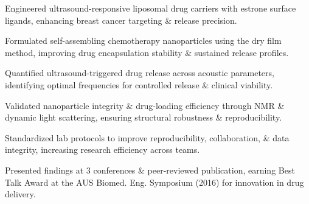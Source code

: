 \begin{tabitemize}
  \item Engineered ultrasound-responsive liposomal drug carriers with estrone surface ligands, enhancing breast cancer targeting \& release precision.
  \item Formulated self-assembling chemotherapy nanoparticles using the dry film method, improving drug encapsulation stability \& sustained release profiles.
  \item Quantified ultrasound-triggered drug release across acoustic parameters, identifying optimal frequencies for controlled release \& clinical viability.
  \item Validated nanoparticle integrity \& drug-loading efficiency through NMR \& dynamic light scattering, ensuring structural robustness \& reproducibility.
  \item Standardized lab protocols to improve reproducibility, collaboration, \& data integrity, increasing research efficiency across teams.
  \item Presented findings at 3 conferences \& peer-reviewed publication, earning Best Talk Award at the AUS Biomed. Eng. Symposium (2016) for innovation in drug delivery.
\end{tabitemize}
\vspace{-1.5\baselineskip}

